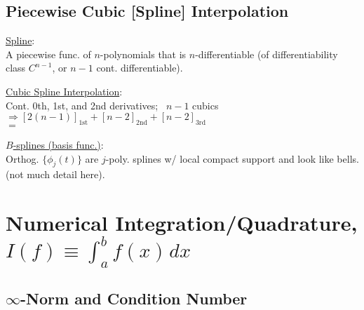 \documentclass[12pt]{article}
\newcommand{\hs}{\hspace{1pt}}
\begin{document}
\subsection{Piecewise Cubic [Spline] Interpolation}

\parbox[t]{4.5cm}{
    \underline{Spline}: \\[4pt] 
    {\scriptsize 
        A piecewise func. of \(n\)-polynomials that is \(n\)-differentiable (of differentiability class \(C^{n-1}\), 
        or \(n-1\) cont. differentiable).
    }
}
\hspace{.75cm}
\parbox[t]{6.5cm}{
    \underline{Cubic Spline Interpolation}: \\[5pt] 
    {\scriptsize 
        Cont. 0th, 1st, and 2nd derivatives; \ \(n-1\) cubics \\
        \(\Rightarrow [2(n-1)]_\text{1st} + [n-2]_\text{2nd} + [n-2]_\text{3rd}\)\\
        \(=\) 
    }
}
\hspace{.75cm}
\parbox[t]{4.5cm}{
    \underline{\(B\)-splines (basis func.)}: \\[4pt] 
    {\scriptsize 
        Orthog. \(\{\phi_j(t)\}\) are \(j\)-poly. splines w/ local compact support and look like bells.
        (not much detail here).
    }
}

\newpage
\section{Numerical Integration/Quadrature, \(I(f) \equiv \int_a^b f(x)\hs dx\)}

\subsection{\(\infty\)-Norm and Condition Number}
\end{document}
